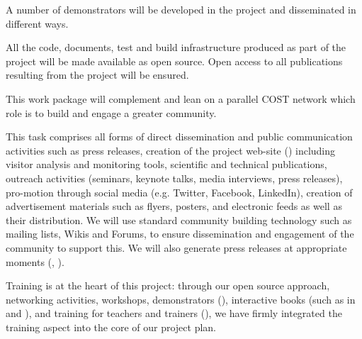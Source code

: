 \begin{workpackage}
\begin{wpdescription}
  A number of demonstrators will be developed in the project and
  disseminated in different ways.

  All the code, documents, test and build infrastructure produced as
  part of the project will be made available as open source. 
  Open access to all publications resulting from the project will be ensured.

  This work package will complement and lean on a parallel COST
  network which role is to build and engage a greater community.
\end{wpdescription}

\begin{tasklist}

\begin{task}[title=Dissemination and Communication activities, lead=PS, partners={SA}, id=dissemination-communication, PM=11, wphases=0-48 ]

  This task comprises all forms of direct dissemination and public
  communication activities such as press releases, creation of the
  project web-site () including visitor analysis and monitoring tools,
  scientific and technical publications, outreach activities
  (seminars, keynote talks, media interviews, press releases),
  pro-motion through social media (e.g. Twitter, Facebook, LinkedIn),
  creation of advertisement materials such as flyers, posters, and
  electronic feeds as well as their distribution. We will use standard
  community building technology such as mailing lists, Wikis and
  Forums, to ensure dissemination and engagement of the community to
  support this. We will also generate press releases at appropriate
  moments (, ). %


\end{task}

\begin{task}[title=Training and training portal,
id=training-portal,lead=PS,PM=1,wphases={0-48!.1,0-1}]
Training is at the heart of this project: through our open source
approach, networking activities, workshops, demonstrators
(), interactive books (such
as in  and
), and training for teachers and trainers
(), we have firmly integrated the training
aspect into the core of our project plan.


\end{task}
\end{tasklist}
\end{workpackage}
